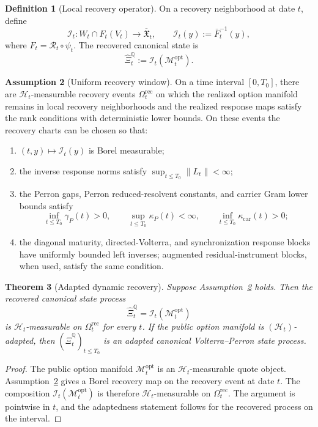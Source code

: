 \documentclass[11pt,a4paper]{amsart}
\theoremstyle{plain}
\newtheorem{theorem}{Theorem}[section]
\theoremstyle{definition}
\newtheorem{definition}[theorem]{Definition}
\newtheorem{assumption}[theorem]{Assumption}
\theoremstyle{remark}
\newcommand{\QQ}{\mathbb{Q}}
\newcommand{\cH}{\mathcal{H}}
\newcommand{\cM}{\mathcal{M}}
\newcommand{\norm}[1]{\left\lVert #1\right\rVert}
\begin{document}
\begin{definition}[Local recovery operator]\label{def:local-recovery-operator}
On a recovery neighborhood at date \(t\), define
\[
        \mathcal I_t:W_t\cap F_t(V_t)\to\overline{\mathfrak X}_t,
        \qquad
        \mathcal I_t(y):=\bar F_t^{-1}(y),
\]
where \(F_t=\mathcal R_t\circ\psi_t\).  The recovered canonical state is
\[
        \widehat\Xi_t^\QQ
        :=
        \mathcal I_t(\cM_t^{\mathrm{opt}}).
\]
\end{definition}

\begin{assumption}[Uniform recovery window]\label{ass:uniform-recovery}
On a time interval \([0,T_0]\), there are \(\cH_t\)-measurable recovery events
\(\Omega_t^{\mathrm{rec}}\) on which the realized option manifold remains in local recovery
neighborhoods and the realized response maps satisfy the rank conditions with deterministic
lower bounds.  On these events the recovery charts can be chosen so that:
\begin{enumerate}[leftmargin=2em]
\item \((t,y)\mapsto\mathcal I_t(y)\) is Borel measurable;
\item the inverse response norms satisfy \(\sup_{t\le T_0}\norm{L_t}<\infty\);
\item the Perron gaps, Perron reduced-resolvent constants, and carrier Gram lower bounds satisfy
\[
        \inf_{t\le T_0}\gamma_P(t)>0,
        \qquad
        \sup_{t\le T_0}\kappa_P(t)<\infty,
        \qquad
        \inf_{t\le T_0}\kappa_{\mathrm{car}}(t)>0;
\]
\item the diagonal maturity, directed-Volterra, and synchronization response blocks have uniformly
bounded left inverses; augmented residual-instrument blocks, when used, satisfy the same
condition.
\end{enumerate}
\end{assumption}

\begin{theorem}[Adapted dynamic recovery]\label{thm:adapted-dynamic-recovery}
Suppose Assumption~\ref{ass:uniform-recovery} holds.  Then the recovered canonical state process
\[
        \widehat\Xi_t^\QQ=\mathcal I_t(\cM_t^{\mathrm{opt}})
\]
is \(\cH_t\)-measurable on \(\Omega_t^{\mathrm{rec}}\) for every \(t\).  If the public option manifold is
\((\cH_t)\)-adapted, then \((\widehat\Xi_t^\QQ)_{t\le T_0}\) is an adapted canonical
Volterra--Perron state process.
\end{theorem}

\begin{proof}
The public option manifold \(\cM_t^{\mathrm{opt}}\) is an \(\cH_t\)-measurable quote object.
Assumption~\ref{ass:uniform-recovery} gives a Borel recovery map on the recovery event at date
\(t\).  The composition \(\mathcal I_t(\cM_t^{\mathrm{opt}})\) is therefore
\(\cH_t\)-measurable on \(\Omega_t^{\mathrm{rec}}\).  The argument is pointwise in \(t\), and the
adaptedness statement follows for the recovered process on the interval.
\end{proof}
\end{document}
